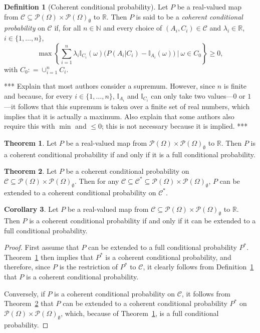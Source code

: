 \documentclass[10pt]{paper}
\theoremstyle{definition}
\newtheorem{theorem}{Theorem}
\newtheorem{corollary}[theorem]{Corollary}
\newtheorem{definition}{Definition}
\newcommand{\reals}{\mathbb{R}}
\newcommand{\paths}{\Omega}
\newcommand{\power}{\mathcal{P}(\paths)}
\newcommand{\nonemptypower}{\power_{\emptyset}}
\newcommand{\ind}[1]{\mathbb{I}_{#1}}
\newcommand{\coloneqq}{:\!=}
\begin{document}
\begin{definition}[Coherent conditional probability]\label{def:coherence}
Let $P$ be a real-valued map from $\mathcal{C}\subseteq\power\times\nonemptypower$ to $\reals$. Then $P$ is said to be a \emph{coherent conditional probability} on $\mathcal{C}$ if, for all $n\in\mathbb{N}$ and every choice of $(A_i,C_i)\in\mathcal{C}$ and $\lambda_i\in\reals$, $i\in\{1,\dots,n\}$,
\begin{equation*}
\max\left\{\sum_{i=1}^n\lambda_i\ind{C_i}(\omega)\bigl(P(A_i\vert C_i)-\ind{A_i}(\omega)\bigr)~\Bigg\vert~\omega\in C_0\right\}\geq0,
\end{equation*}
with $C_0\coloneqq\cup_{i=1}^nC_i$.
\end{definition}

*** Explain that most authors consider a supremum. However, since $n$ is finite and because, for every $i\in\{1,\dots,n\}$, $\ind{A_i}$ and $\ind{C_i}$ can only take two values---$0$ or $1$---it follows that this supremum is taken over a finite set of real numbers, which implies that it is actually a maximum. Also explain that some authors also require this with $\min$ and $\leq0$; this is not necessary because it is implied. ***

\begin{theorem}{\cite[Theorem 3]{regazzini1985finitely}}\label{theo:fullcoherent}
Let $P$ be a real-valued map from $\power\times\nonemptypower$ to $\reals$. Then $P$ is a coherent conditional probability if and only if it is a full conditional probability.
\end{theorem}

\begin{theorem}{\cite[Theorem 4]{regazzini1985finitely}}\label{theo:largerdomain}
Let $P$ be a coherent conditional probability on $\mathcal{C}\subseteq\power\times\nonemptypower$. Then for any $\mathcal{C}\subseteq\mathcal{C}^*\subseteq\power\times\nonemptypower$, $P$ can be extended to a coherent conditional probability on $\mathcal{C}^*$.
\end{theorem}


\begin{corollary}\label{corol:coherentextendable}
Let $P$ be a real-valued map from $\mathcal{C}\subseteq\power\times\nonemptypower$ to $\reals$. Then $P$ is a coherent conditional probability if and only if it can be extended to a full conditional probability.
\end{corollary}
\begin{proof}
First assume that $P$ can be extended to a full conditional probability $P^*$. Theorem~\ref{theo:fullcoherent} then implies that $P^*$ is a coherent conditional probability, and therefore, since $P$ is the restriction of $P^*$ to $\mathcal{C}$, it clearly follows from Definition~\ref{def:coherence} that $P$ is a coherent conditional probability.

Conversely, if $P$ is a coherent conditional probability on $\mathcal{C}$, it follows from Theorem~\ref{theo:largerdomain} that $P$ can be extended to a coherent conditional probability $P^*$ on $\power\times\nonemptypower$, which, because of Theorem~\ref{theo:fullcoherent}, is a full conditional probability.
\end{proof}
\end{document}
